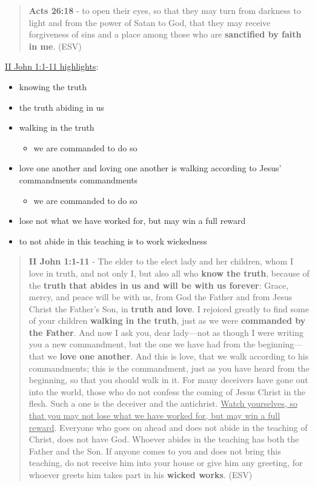 \documentclass[11pt]{article}
\begin{document}
\begin{quote}
\textbf{Acts 26:18} - to open their eyes, so that they may turn from darkness to light and from the power of Satan to God, that they may receive forgiveness of sins and a place among those who are \textbf{sanctified by faith in me}. (ESV)
\end{quote}

\uline{II John 1:1-11 highlights}:
\begin{itemize}
\item knowing the truth
\item the truth abiding in us
\item walking in the truth
\begin{itemize}
\item we are commanded to do so
\end{itemize}
\item love one another and loving one another is walking according to Jesus' commandments commandments
\begin{itemize}
\item we are commanded to do so
\end{itemize}
\item lose not what we have worked for, but may win a full reward
\item to not abide in this teaching is to work wickedness
\end{itemize}

\begin{quote}
\textbf{II John 1:1-11} - The elder to the elect lady and her children, whom I love in truth, and not only I, but also all who \textbf{know the truth}, because of the \textbf{truth that abides in us and will be with us forever}: Grace, mercy, and peace will be with us, from God the Father and from Jesus Christ the Father's Son, in \textbf{truth and love}.  I rejoiced greatly to find some of your children \textbf{walking in the truth}, just as we were \textbf{commanded by the Father}.  And now I ask you, dear lady—not as though I were writing you a new commandment, but the one we have had from the beginning—that we \textbf{love one another}.  And this is love, that we walk according to his commandments; this is the commandment, just as you have heard from the beginning, so that you should walk in it.  For many deceivers have gone out into the world, those who do not confess the coming of Jesus Christ in the flesh. Such a one is the deceiver and the antichrist.  \uline{Watch yourselves, so that you may not lose what we have worked for, but may win a full reward}.  Everyone who goes on ahead and does not abide in the teaching of Christ, does not have God. Whoever abides in the teaching has both the Father and the Son.  If anyone comes to you and does not bring this teaching, do not receive him into your house or give him any greeting, for whoever greets him takes part in his \textbf{wicked works}. (ESV)
\end{quote}
\end{document}
